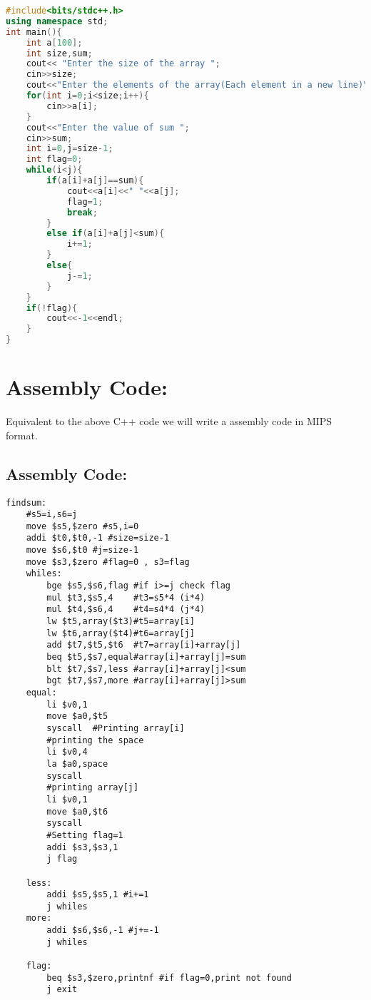 \documentclass[a4paper,10pt]{article} %
\begin{document}
\begin{codebox}
    
\begin{lstlisting}[language=C++]
#include<bits/stdc++.h>
using namespace std;
int main(){
    int a[100];
    int size,sum;
    cout<< "Enter the size of the array ";
    cin>>size;
    cout<<"Enter the elements of the array(Each element in a new line)\n";
    for(int i=0;i<size;i++){
        cin>>a[i];
    }
    cout<<"Enter the value of sum ";
    cin>>sum;
    int i=0,j=size-1;
    int flag=0;
    while(i<j){
        if(a[i]+a[j]==sum){
            cout<<a[i]<<" "<<a[j];
            flag=1;
            break;
        }
        else if(a[i]+a[j]<sum){
            i+=1;
        }
        else{
            j-=1;
        }
    }
    if(!flag){
        cout<<-1<<endl;
    }
}
\end{lstlisting} 
\end{codebox}
\newpage

\section*{\huge{\textbf{Assembly Code:}}}

Equivalent to the above C++ code we will write a assembly code in MIPS format.

\subsection*{\large{\textbf{Assembly Code:}}}

\begin{codebox} 
\begin{lstlisting}[language=Assembly]
findsum:
	#s5=i,s6=j
	move $s5,$zero #s5,i=0
	addi $t0,$t0,-1 #size=size-1
	move $s6,$t0 #j=size-1
	move $s3,$zero #flag=0 , s3=flag
	whiles:
		bge $s5,$s6,flag #if i>=j check flag
		mul $t3,$s5,4 	 #t3=s5*4 (i*4)
		mul $t4,$s6,4 	 #t4=s4*4 (j*4)
		lw $t5,array($t3)#t5=array[i]
		lw $t6,array($t4)#t6=array[j]
		add $t7,$t5,$t6  #t7=array[i]+array[j]
		beq $t5,$s7,equal#array[i]+array[j]=sum
		blt $t7,$s7,less #array[i]+array[j]<sum
		bgt $t7,$s7,more #array[i]+array[j]>sum
	equal:
		li $v0,1
		move $a0,$t5
		syscall  #Printing array[i]
		#printing the space
		li $v0,4
		la $a0,space
		syscall
		#printing array[j]
		li $v0,1
		move $a0,$t6
		syscall
		#Setting flag=1	
		addi $s3,$s3,1
		j flag
		
	less:
		addi $s5,$s5,1 #i+=1
		j whiles
	more:
		addi $s6,$s6,-1 #j+=-1
		j whiles
			
	flag:
		beq $s3,$zero,printnf #if flag=0,print not found
		j exit

\end{lstlisting} 
\end{codebox}
\newpage
\end{document}
